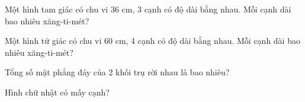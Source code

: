\begin{ex}
Một hình tam giác có chu vi 36 cm, 3 cạnh có độ dài bằng nhau. Mỗi cạnh dài bao nhiêu xăng-ti-mét?
\end{ex}

\begin{ex}
Một hình tứ giác có chu vi 60 cm, 4 cạnh có độ dài bằng nhau. Mỗi cạnh dài bao nhiêu xăng-ti-mét?
\end{ex}

\begin{ex}
Tổng số mặt phẳng đáy của 2 khối trụ rời nhau là bao nhiêu?
\end{ex}

\begin{ex}
Hình chữ nhật có mấy cạnh?
\end{ex}

